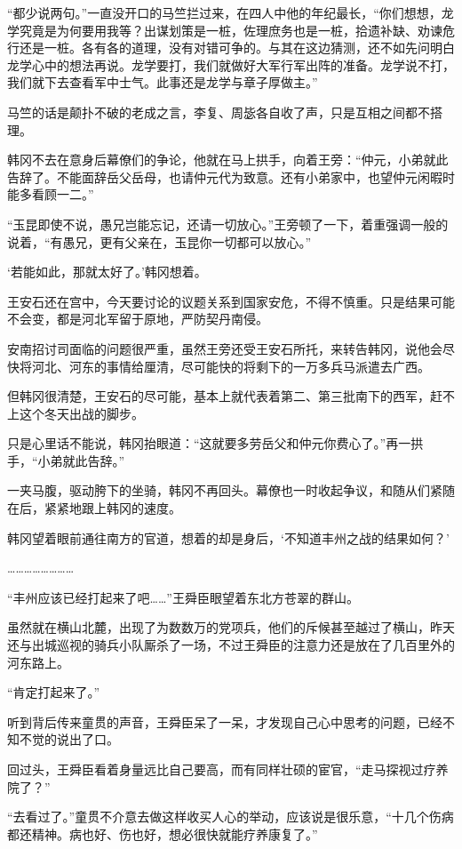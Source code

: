 “都少说两句。”一直没开口的马竺拦过来，在四人中他的年纪最长，“你们想想，龙学究竟是为何要用我等？出谋划策是一桩，佐理庶务也是一桩，拾遗补缺、劝谏危行还是一桩。各有各的道理，没有对错可争的。与其在这边猜测，还不如先问明白龙学心中的想法再说。龙学要打，我们就做好大军行军出阵的准备。龙学说不打，我们就下去查看军中士气。此事还是龙学与章子厚做主。”

马竺的话是颠扑不破的老成之言，李复、周毖各自收了声，只是互相之间都不搭理。

韩冈不去在意身后幕僚们的争论，他就在马上拱手，向着王旁：“仲元，小弟就此告辞了。不能面辞岳父岳母，也请仲元代为致意。还有小弟家中，也望仲元闲暇时能多看顾一二。”

“玉昆即使不说，愚兄岂能忘记，还请一切放心。”王旁顿了一下，着重强调一般的说着，“有愚兄，更有父亲在，玉昆你一切都可以放心。”

‘若能如此，那就太好了。’韩冈想着。

王安石还在宫中，今天要讨论的议题关系到国家安危，不得不慎重。只是结果可能不会变，都是河北军留于原地，严防契丹南侵。

安南招讨司面临的问题很严重，虽然王旁还受王安石所托，来转告韩冈，说他会尽快将河北、河东的事情给厘清，尽可能快的将剩下的一万多兵马派遣去广西。

但韩冈很清楚，王安石的尽可能，基本上就代表着第二、第三批南下的西军，赶不上这个冬天出战的脚步。

只是心里话不能说，韩冈抬眼道：“这就要多劳岳父和仲元你费心了。”再一拱手，“小弟就此告辞。”

一夹马腹，驱动胯下的坐骑，韩冈不再回头。幕僚也一时收起争议，和随从们紧随在后，紧紧地跟上韩冈的速度。

韩冈望着眼前通往南方的官道，想着的却是身后，‘不知道丰州之战的结果如何？’

……………………

“丰州应该已经打起来了吧……”王舜臣眼望着东北方苍翠的群山。

虽然就在横山北麓，出现了为数数万的党项兵，他们的斥候甚至越过了横山，昨天还与出城巡视的骑兵小队厮杀了一场，不过王舜臣的注意力还是放在了几百里外的河东路上。

“肯定打起来了。”

听到背后传来童贯的声音，王舜臣呆了一呆，才发现自己心中思考的问题，已经不知不觉的说出了口。

回过头，王舜臣看着身量远比自己要高，而有同样壮硕的宦官，“走马探视过疗养院了？”

“去看过了。”童贯不介意去做这样收买人心的举动，应该说是很乐意，“十几个伤病都还精神。病也好、伤也好，想必很快就能疗养康复了。”

